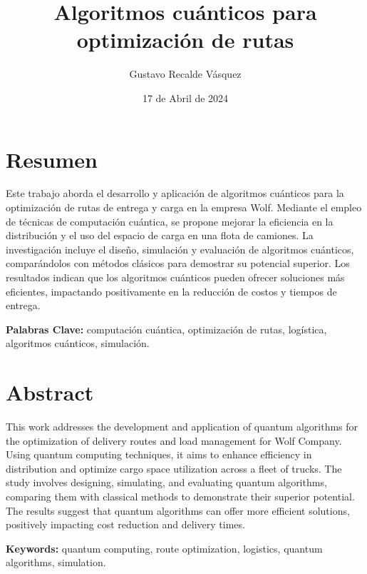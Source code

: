 \documentclass[11pt,a4paper,spanish]{book}
\title{ Algoritmos cuánticos para optimización de rutas}
\author{ Gustavo Recalde Vásquez}
\date{ 17 de Abril de 2024}
\begin{document}
    \renewcommand{\listfigurename}{Índice de Ilustraciones}
    \renewcommand{\listtablename}{Índice de Tablas}
    \renewcommand{\contentsname}{Índice de Contenidos}
    \renewcommand{\figurename}{Figura}
    \renewcommand{\tablename}{Tabla}

    \maketitle

    \frontmatter
    \tableofcontents
    \listoffigures
    \listoftables

    \chapter{Resumen}

    Este trabajo aborda el desarrollo y aplicación de algoritmos cuánticos para la optimización de rutas de entrega y carga en la empresa Wolf. Mediante el empleo de técnicas de computación cuántica, se propone mejorar la eficiencia en la distribución y el uso del espacio de carga en una flota de camiones. La investigación incluye el diseño, simulación y evaluación de algoritmos cuánticos, comparándolos con métodos clásicos para demostrar su potencial superior. Los resultados indican que los algoritmos cuánticos pueden ofrecer soluciones más eficientes, impactando positivamente en la reducción de costos y tiempos de entrega.

        {\bf Palabras Clave:} computación cuántica, optimización de rutas, logística, algoritmos cuánticos, simulación.


    \chapter{Abstract}

    This work addresses the development and application of quantum algorithms for the optimization of delivery routes and load management for Wolf Company. Using quantum computing techniques, it aims to enhance efficiency in distribution and optimize cargo space utilization across a fleet of trucks. The study involves designing, simulating, and evaluating quantum algorithms, comparing them with classical methods to demonstrate their superior potential. The results suggest that quantum algorithms can offer more efficient solutions, positively impacting cost reduction and delivery times.

        {\bf Keywords:} quantum computing, route optimization, logistics, quantum algorithms, simulation.
\end{document}
